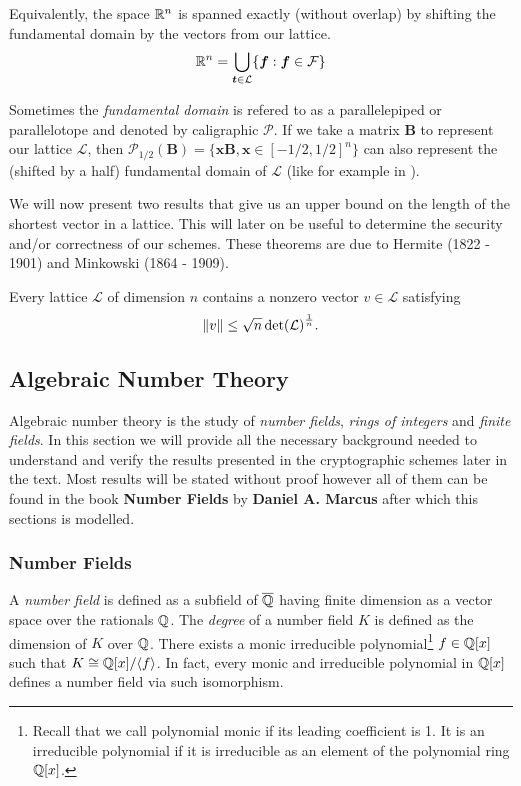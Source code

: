 Equivalently, the space $\mathbb{R}^n$ is spanned exactly (without overlap) by shifting the fundamental domain by the vectors from our lattice.
$$ \mathbb{R}^n = \bigcup_{\boldsymbol{t} \in \mathcal{L}} \{\boldsymbol{f} : \boldsymbol{f} \in \mathcal{F} \}$$

\begin{remark}
    Sometimes the \textit{fundamental domain} is refered to as a parallelepiped or parallelotope and denoted by caligraphic $\mathcal{P}$. If we take a matrix $\bm{B}$ to represent our lattice $\mathcal{L}$, then $\mathcal{P}_{1/2}(\bm{B}) = \{\bm{x}\bm{B}, \bm{x} \in [-1/2, 1/2]^n \}$ can also represent the (shifted by a half) fundamental domain of $\mathcal{L}$ (like for example in \cite{gentry}).
\end{remark}

We will now present two results that give us an upper bound on the length of the shortest vector in a lattice. This will later on be useful to determine the security and/or correctness of our schemes. These theorems are due to Hermite (1822 - 1901) and Minkowski (1864 - 1909).

\begin{theorem}
    Every lattice $\mathcal{L}$ of dimension $n$ contains a nonzero vector $v \in \mathcal{L}$ satisfying
    $$ \norm{v} \leq \sqrt{n} \det(\mathcal{L})^{\frac{1}{n}}.$$
\end{theorem}

\subsection{Algebraic Number Theory}

Algebraic number theory is the study of \textit{number fields}, \textit{rings of integers} and \textit{finite fields}. In this section we will provide all the necessary background needed to understand and verify the results presented in the cryptographic schemes later in the text. Most results will be stated without proof however all of them can be found in the book \textbf{Number Fields} by \textbf{Daniel A. Marcus} \cite{algebra} after which this sections is modelled.

\subsubsection*{Number Fields}
A \textit{number field} is defined as a subfield of $\overline{\mathbb{Q}}$ having finite dimension as a vector space over the rationals $\mathbb{Q}$. The \textit{degree} of a number field $K$ is defined as the dimension of $K$ over $\mathbb{Q}$. There exists a monic irreducible polynomial\footnote{Recall that we call polynomial monic if its leading coefficient is 1. It is an irreducible polynomial if it is irreducible as an element of the polynomial ring $\mathbb{Q}[x]$.} $f \in \mathbb{Q}[x]$ such that $K \cong \mathbb{Q}[x]/\langle f \rangle$. In fact, every monic and irreducible polynomial in $\mathbb{Q}[x]$ defines a number field via such isomorphism.

